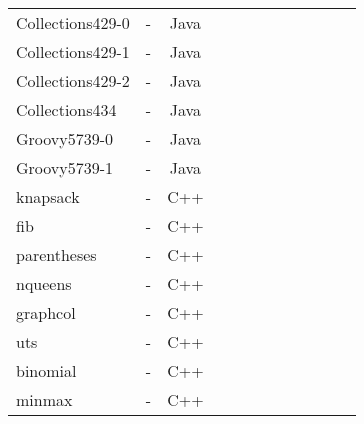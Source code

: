\begin{table}[h!]
\begin{tabular}{lccccccccccc}
    Collections429-0    &  -  & Java  &  &              &    &                                 &                   &                           &                  &&              \\
    Collections429-1    &  -  & Java  &  &              &    &                                 &                   &                           &                  &&              \\
    Collections429-2    &  -  & Java  &  &              &    &                                 &                   &                           &                  &&              \\
    Collections434    & -   & Java  &  &              &    &                                 &                   &                           &                    &&            \\
    \midrule
    Groovy5739-0      & -  & Java  &  &              &    &                                 &                   &                           &                     &&           \\
    Groovy5739-1      & -  & Java  &  &              &    &                                 &                   &                           &                     &&          \\
    \midrule
    \midrule
    knapsack      &  -  & C++  &  &              &    &                                 &                   &                           &                         &&     \\
    fib      &  - & C++  &  &              &    &                                 &                   &                           &                               && \\
    parentheses      & -   & C++  &  &              &    &                                 &                   &                           &                      &&          \\
    nqueens      &  -  & C++  &  &              &    &                                 &                   &                           &                          &&      \\
    graphcol      &  -  & C++  &  &              &    &                                 &                   &                           &                         &&     \\
    uts      &  -  & C++  &  &              &    &                                 &                   &                           &                              && \\
    binomial      &  -  & C++  &  &              &    &                                 &                   &                           &                         &&       \\
    minmax      &  -  & C++  &  &              &    &                                 &                   &                           &                           &&    \\



\end{tabular}
\end{table}
